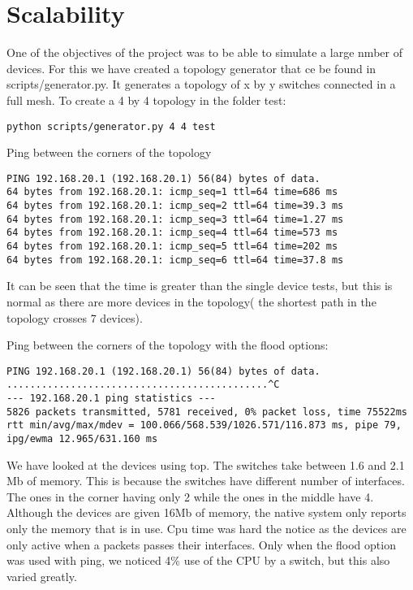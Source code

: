 \section{Scalability}
\label{sec:scalability}

One of the objectives of the project was to be able to simulate a large nmber of devices. For this we have
created a topology generator that ce be found in scripts/generator.py. It generates a topology of
x by y switches connected in a full mesh. To create a 4 by 4 topology in the folder test:
\begin{lstlisting}
python scripts/generator.py 4 4 test
\end{lstlisting}

Ping between the corners of the topology
\begin{lstlisting}
PING 192.168.20.1 (192.168.20.1) 56(84) bytes of data.
64 bytes from 192.168.20.1: icmp_seq=1 ttl=64 time=686 ms
64 bytes from 192.168.20.1: icmp_seq=2 ttl=64 time=39.3 ms
64 bytes from 192.168.20.1: icmp_seq=3 ttl=64 time=1.27 ms
64 bytes from 192.168.20.1: icmp_seq=4 ttl=64 time=573 ms
64 bytes from 192.168.20.1: icmp_seq=5 ttl=64 time=202 ms
64 bytes from 192.168.20.1: icmp_seq=6 ttl=64 time=37.8 ms
\end{lstlisting}
It can be seen that the time is greater than the single device
tests, but this is normal as there are more devices in the topology(
the shortest path in the topology crosses 7 devices).

Ping between the corners of the topology with the flood options:
\begin{lstlisting}
PING 192.168.20.1 (192.168.20.1) 56(84) bytes of data.
.............................................^C                                
--- 192.168.20.1 ping statistics ---
5826 packets transmitted, 5781 received, 0% packet loss, time 75522ms
rtt min/avg/max/mdev = 100.066/568.539/1026.571/116.873 ms, pipe 79, ipg/ewma 12.965/631.160 ms
\end{lstlisting}

We have looked at the devices using top. The switches take between 1.6 and 2.1 Mb of memory. This is
because the switches have different number of interfaces. The ones in the corner having only 2 while
the ones in the middle have 4. Although the devices are given 16Mb of memory, the native system
only reports only the memory that is in use. Cpu time was hard the notice as the devices are only active
when a packets passes their interfaces. Only when the flood option was used with ping, we noticed
4\% use of the CPU by a switch, but this also varied greatly. 

